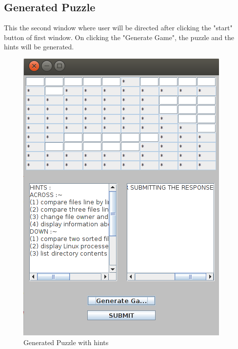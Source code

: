 \subsection{Generated Puzzle}
This the second window where user will be directed after clicking the "start" button of first window. On clicking the "Generate Game", the puzzle and the hints will be generated.  
\begin{figure}[!ht]
\centering
\includegraphics[scale=0.6]{puzzle.png}
\caption{\label{img5} Generated Puzzle with hints}
\end{figure}
\newpage

